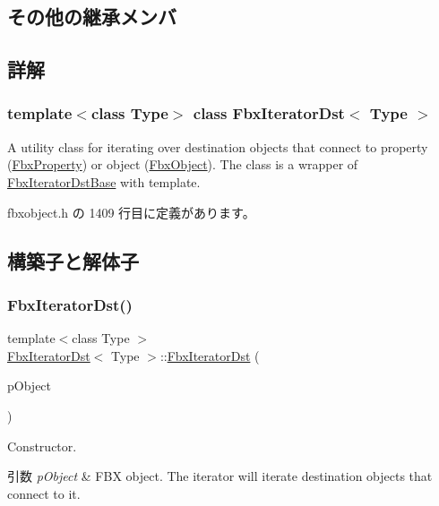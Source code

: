 \subsection*{その他の継承メンバ}


\subsection{詳解}
\subsubsection*{template$<$class Type$>$\newline
class Fbx\+Iterator\+Dst$<$ Type $>$}

A utility class for iterating over destination objects that connect to property (\hyperlink{class_fbx_property}{Fbx\+Property}) or object (\hyperlink{class_fbx_object}{Fbx\+Object}). The class is a wrapper of \hyperlink{class_fbx_iterator_dst_base}{Fbx\+Iterator\+Dst\+Base} with template. 

 fbxobject.\+h の 1409 行目に定義があります。



\subsection{構築子と解体子}
\mbox{\label{class_fbx_iterator_dst_a620226076a20ced72d2e4e3e902e447b}} 
\subsubsection{\texorpdfstring{Fbx\+Iterator\+Dst()}{FbxIteratorDst()}\hspace{0.1cm}{\footnotesize\ttfamily [1/2]}}
{\footnotesize\ttfamily template$<$class Type $>$ \\
\hyperlink{class_fbx_iterator_dst}{Fbx\+Iterator\+Dst}$<$ Type $>$\+::\hyperlink{class_fbx_iterator_dst}{Fbx\+Iterator\+Dst} (\begin{DoxyParamCaption}\item[{\hyperlink{class_fbx_object}{Fbx\+Object} $\ast$}]{p\+Object }\end{DoxyParamCaption})\hspace{0.3cm}{\ttfamily [inline]}}

Constructor. 
\begin{DoxyParams}{引数}
{\em p\+Object} & F\+BX object. The iterator will iterate destination objects that connect to it. \\
\hline
\end{DoxyParams}


